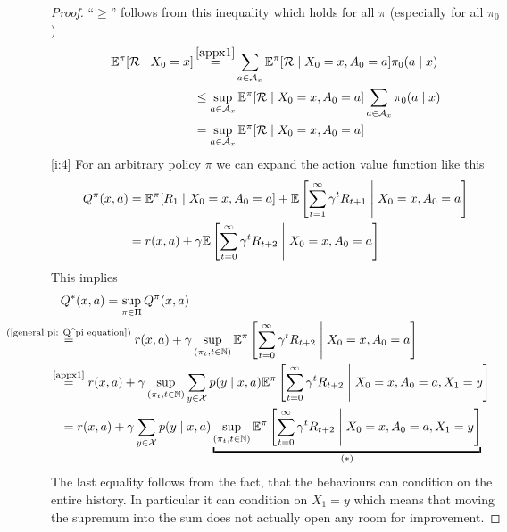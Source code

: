 \begin{proof}
	\noindent ``\(\geq\)'' follows from this inequality which holds for all \(\pi\) (especially for all \(\pi_0\))
	\begin{align*}
		\E^\pi[\cR\mid X_0=x]
		&\xeq{\ref{appx1}}\sum_{a\in\cA_x}\E^\pi[\cR \mid X_0=x,A_0=a]\pi_0(a\mid x)\\
		&\leq \sup_{a\in\cA_x}\E^\pi[\cR \mid X_0=x, A_0=a]\sum_{a\in\cA_x}\pi_0(a\mid x)\\
		&=\sup_{a\in\cA_x}\E^\pi[\cR \mid X_0=x, A_0=a]
	\end{align*}
	\ref{i:4} For an arbitrary policy \(\pi\) we can expand the action value function like this
	\begin{align}
		Q^\pi(x,a)&=\mathbb{E}^\pi[R_1\mid X_0=x, A_0=a]
		+\mathbb{E}\left[\sum_{t=1}^\infty \gamma^t R_{t+1}\;\middle|\; X_0=x,A_0=a\right]
		\nonumber\\
		&=r(x,a) + \gamma \mathbb{E}\left[\sum_{t=0}^\infty \gamma^t R_{t+2}\;\middle|\; X_0=x,A_0=a\right] \label{general pi: Q^pi equation}
	\end{align}
	This implies
	\begin{align*}
		&Q^*(x,a)=\sup_{\pi\in\Pi} Q^\pi (x,a)
		\\
		&\lxeq{\text{(\ref{general pi: Q^pi equation})}} r(x,a)
		+ \gamma \sup_{(\pi_t,t\in\N)} \E^\pi\left[\sum_{t=0}^\infty \gamma^t R_{t+2}
		\;\middle|\; X_0=x,A_0=a \right]
		\\
		&\lxeq{\text{\ref{appx1}}}r(x,a)
		+\gamma \sup_{(\pi_t,t\in\N)} \sum_{y\in\cX} p(y\mid x, a)
		\E^\pi\left[\sum_{t=0}^\infty \gamma^t R_{t+2}\;\middle|\; X_0=x,A_0=a, X_1=y \right]
		\\
		&=r(x,a)
		+\gamma \sum_{y\in\cX} p(y\mid x, a) \underbracket{
			\sup_{(\pi_t,t\in\N)}
			\E^\pi\left[\sum_{t=0}^\infty \gamma^t R_{t+2}\;\middle|\; X_0=x,A_0=a, X_1=y \right]
		}_{(*)}
	\end{align*}
	The last equality follows from the fact, that the behaviours can condition on the entire history. In particular it can condition on \(X_1=y\) which means that moving the supremum into the sum does not actually open any room for improvement. 


\end{proof}
